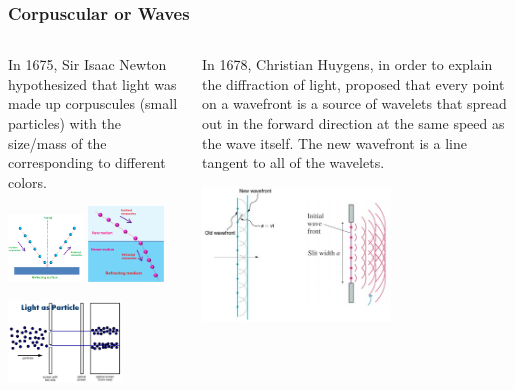 \documentclass{beamer}
\begin{document}
\begin{frame}\frametitle{Corpuscular or Waves}
\begin{columns}
\begin{column}{5cm}
In 1675, Sir Isaac Newton hypothesized that light was made up corpuscules (small particles) with the size/mass of the corresponding to different colors. 
\begin{center}
\includegraphics[width=2cm]{fig/corpReflect.png}
\includegraphics[width=2cm]{fig/corpRefract.png}
\end{center}

\begin{center}
\includegraphics[width=3cm]{fig/corpDoubleSlit.png}
\end{center}
\end{column}
\begin{column}{6cm}
In 1678, Christian Huygens, in order to explain the diffraction of light, proposed that every point on a wavefront is a source of wavelets that spread out in the forward direction at the same speed as the wave itself. The new wavefront is a line tangent to all of the wavelets.
\begin{center}
\includegraphics[width=5cm]{fig/huygens3.jpg}
\end{center}
\end{column}
\end{columns}
\end{frame}
\end{document}
